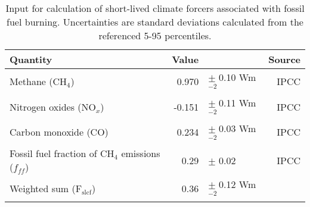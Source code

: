 \documentclass[12pt]{book}
\begin{document}
\begin{table}
  \caption{ Input for calculation of short-lived climate forcers associated with fossil fuel burning. Uncertainties are standard deviations calculated from the referenced 5-95 percentiles. }
  \vspace{0.5 cm}
  \centering
  \begin{tabular}{lrlr}
    \hline
    Quantity & Value &  & Source\\
    \hline
    Methane (CH$_4$)              & 0.970 &$\pm$ 0.10 Wm$^{-2}$                  & IPCC\citep{Myhre:2013ui} \\
    Nitrogen oxides (NO$_x$)     & -0.151 &$\pm$ 0.11 Wm$^{-2}$                  & IPCC\citep{Myhre:2013ui} \\
    Carbon monoxide (CO)       & 0.234 &$\pm$ 0.03 Wm$^{-2}$                  & IPCC\citep{Myhre:2013ui} \\
    Fossil fuel fraction of CH$_4$ emissions ($f_{ff}$) & 0.29 &$\pm$ 0.02   & IPCC\citep{Ciais:2013ui} \\
    \hline
    Weighted sum (F$_\textrm{slcf}$)      & 0.36   &$\pm$ 0.12 Wm$^{-2}$                  & \\
    \hline
  \end{tabular}

  \label{table:slcfs}
\end{table}
\end{document}
